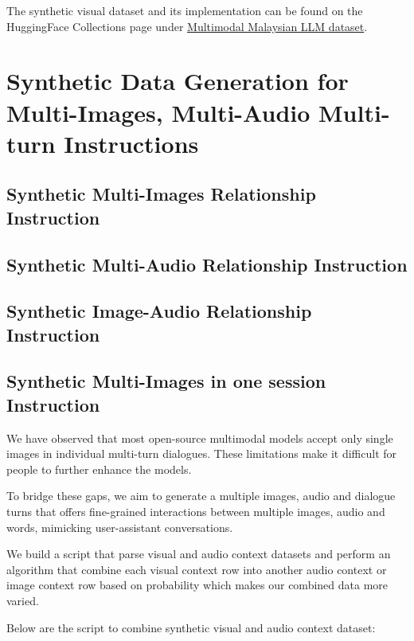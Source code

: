\documentclass[preprint]{article}
\begin{document}
The synthetic visual dataset and its implementation can be found on the HuggingFace Collections page under \href{https://huggingface.co/collections/mesolitica/multimodal-malaysian-llm-dataset-653a16214037a1bc4417eb3a}{Multimodal Malaysian LLM dataset}.

\section{Synthetic Data Generation for Multi-Images, Multi-Audio Multi-turn Instructions}

\subsection{Synthetic Multi-Images Relationship Instruction}

\subsection{Synthetic Multi-Audio Relationship Instruction}

\subsection{Synthetic Image-Audio Relationship Instruction}

\subsection{Synthetic Multi-Images in one session Instruction}

We have observed that most open-source multimodal models accept only single images in individual multi-turn dialogues. These limitations make it difficult for people to further enhance the models.

To bridge these gaps, we aim to generate a multiple images, audio and dialogue turns that offers fine-grained interactions between multiple images, audio and words, mimicking user-assistant conversations.

We build a script that parse visual and audio context datasets and perform an algorithm that combine each visual context row into another audio context or image context row based on probability which makes our combined data more varied.

Below are the script to combine synthetic visual and audio context dataset:
\end{document}
